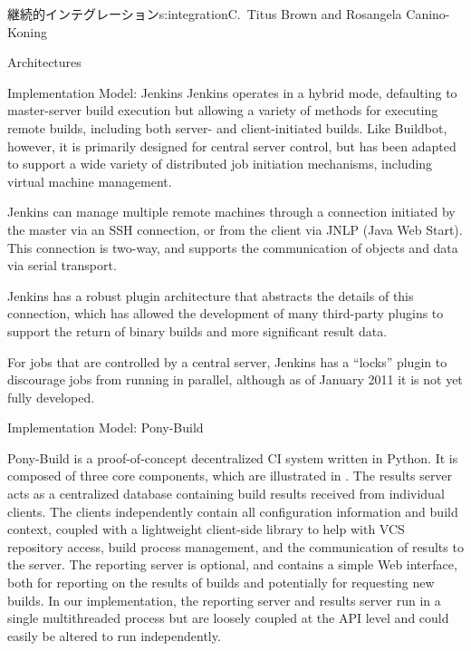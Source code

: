 \begin{aosachapter}{継続的インテグレーション}{s:integration}{C.\ Titus Brown and Rosangela Canino-Koning}
\begin{aosasect1}{Architectures}
\begin{aosasect2}{Implementation Model: Jenkins}
Jenkins operates in a hybrid mode, defaulting to master-server build
execution but allowing a variety of methods for executing remote
builds, including both server- and client-initiated builds. Like
Buildbot, however, it is primarily designed for central server
control, but has been adapted to support a wide variety of distributed
job initiation mechanisms, including virtual machine management.

Jenkins can manage multiple remote machines through a connection
initiated by the master via an SSH connection, or from the client via
JNLP (Java Web Start). This connection is two-way, and supports the
communication of objects and data via serial transport. 

Jenkins has a robust plugin architecture that abstracts the details of
this connection, which has allowed the development of many third-party
plugins to support the return of binary builds and more significant
result data.

For jobs that are controlled by a central server, Jenkins has a
``locks'' plugin to discourage jobs from running in parallel, although
as of January 2011 it is not yet fully developed.

\end{aosasect2}

\begin{aosasect2}{Implementation Model: Pony-Build}


Pony-Build is a proof-of-concept decentralized CI system written in
Python. It is composed of three core components, which are illustrated
in . The results server acts as a
centralized database containing build results received from individual
clients. The clients independently contain all configuration
information and build context, coupled with a lightweight client-side
library to help with VCS repository access, build process management,
and the communication of results to the server. The reporting server
is optional, and contains a simple Web interface, both for reporting
on the results of builds and potentially for requesting new builds. In
our implementation, the reporting server and results server run in a
single multithreaded process but are loosely coupled at the API level
and could easily be altered to run independently.


\end{aosasect2}
\end{aosasect1}
\end{aosachapter}
